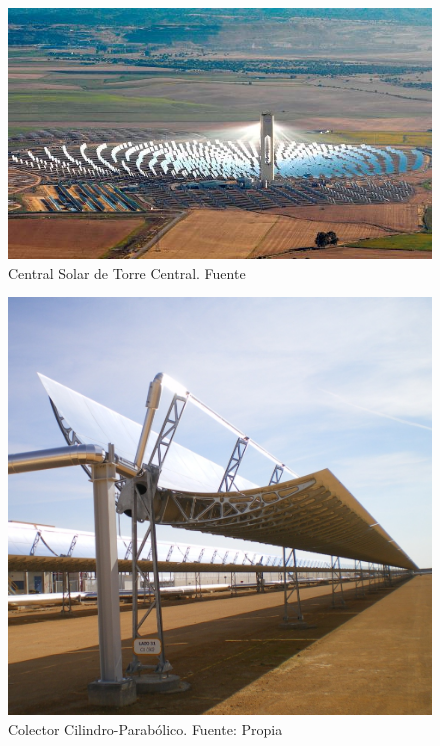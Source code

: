 \begin{figure}
\includegraphics[width=0.9\linewidth]{images/torre.png}
\caption{Central Solar de Torre Central. Fuente \cite{Protermosolar}} 
\label{fig:torre}
\end{figure}

\begin{figure}
\includegraphics[width=0.9\linewidth]{images/ccp.png}
\caption{Colector Cilindro-Parabólico. Fuente: Propia} 
\label{fig:ccp}
\end{figure}

